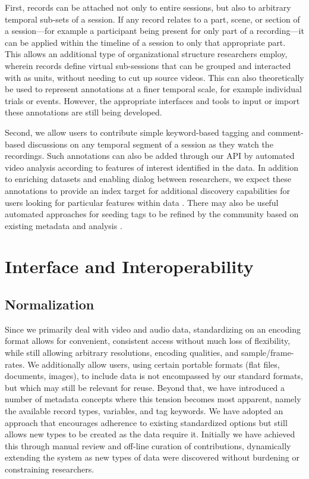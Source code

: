 \documentclass{sig-alternate}
\begin{document}
First, records can be attached not only to entire sessions, but also to arbitrary temporal sub-sets of a session.
If any record relates to a part, scene, or section of a session---for example a participant being present for only part of a recording---it can be applied within the timeline of a session to only that appropriate part.
This allows an additional type of organizational structure researchers employ, wherein records define virtual sub-sessions that can be grouped and interacted with as units, without needing to cut up source videos.
This can also theoretically be used to represent annotations at a finer temporal scale, for example individual trials or events.
However, the appropriate interfaces and tools to input or import these annotations are still being developed.

Second, we allow users to contribute simple keyword-based tagging and comment-based discussions on any temporal segment of a session as they watch the recordings.
Such annotations can also be added through our API by automated video analysis according to features of interest identified in the data.
In addition to enriching datasets and enabling dialog between researchers, we expect these annotations to provide an index target for additional discovery capabilities for users looking for particular features within data \cite{Lanagan_Smeaton_2012}.
There may also be useful automated approaches for seeding tags to be refined by the community based on existing metadata and analysis \cite{Yang_Lu_Giles_2011,Farooq_etal_2007,Giles2013}.

\section{Interface and Interoperability}

\subsection{Normalization}

Since we primarily deal with video and audio data, standardizing on an encoding format allows for convenient, consistent access without much loss of flexibility, while still allowing arbitrary resolutions, encoding qualities, and sample\-/frame-rates.
We additionally allow users, using certain portable formats (flat files, documents, images), to include data is not encompassed by our standard formats, but which may still be relevant for reuse.
Beyond that, we have introduced a number of metadata concepts where this tension becomes most apparent, namely the available record types, variables, and tag keywords.
We have adopted an approach that encourages adherence to existing standardized options but still allows new types to be created as the data require it.
Initially we have achieved this through manual review and off-line curation of contributions, dynamically extending the system as new types of data were discovered without burdening or constraining researchers.
\end{document}
